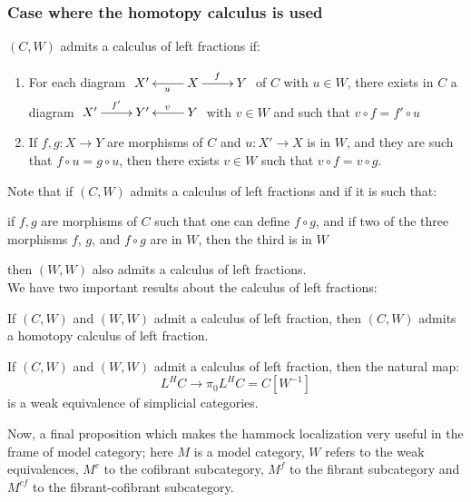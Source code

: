\begin{refsection}
\subsubsection{Case where the homotopy calculus is used}

\begin{defin}
$(C,W)$ admits a calculus of left fractions if:
\begin{enumerate}
\item For each diagram $\xymatrix{{X'} & X \ar[l]^u \ar[r]^f & Y}$ of $C$ with $u \in W$, there exists in $C$ a diagram $\xymatrix{{X'} \ar[r]^{f'} & {Y'}  & Y \ar[l]_v}$ with $v \in W$ and such that $v \circ f = f' \circ u$
\item If $f,g : X \rightarrow Y$ are morphisms of $C$ and $u :X' \rightarrow X$ is in $W$, and they are such that $f \circ u = g \circ u$, then there exists $v \in W$ such that $v \circ f= v \circ g$.
\end{enumerate} 
\end{defin}

Note that if $(C,W)$ admits a calculus of left fractions and if it is such that:
\begin{center}
if $f,g$ are morphisms of $C$ such that one can define $f \circ g$, and if two of the three morphisms $f$, $g$, and $f \circ g$ are in $W$, then the third is in $W$ 
\end{center}
then $(W,W)$ also admits a calculus of left fractions.\\


We have two important results about the calculus of left fractions:

\begin{prop}
If $(C,W)$ and $(W,W)$ admit a calculus of left fraction, then $(C,W)$ admits a homotopy calculus of left fraction.
\end{prop}

\begin{prop}
If $(C,W)$ and $(W,W)$ admit a calculus of left fraction, then the natural map:
\begin{equation}
L^H C \rightarrow \pi_0 L^H C = C[W^{-1}]
\end{equation}
is a weak equivalence of simplicial categories.
\end{prop}

Now, a final proposition which makes the hammock localization very useful in the frame of model category; here $M$ is a model category, $W$ refers to the weak equivalences, $M^c$ to the cofibrant subcategory, $M^f$ to the fibrant subcategory and $M^{cf}$ to the fibrant-cofibrant subcategory.


\end{refsection}
